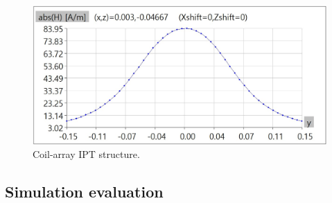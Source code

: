 \begin{figure}[htbp]
    \centering
    \includegraphics[width=0.9\linewidth]{images/4_two_ring_near_field_distribution_cut.JPG}
    \caption{Coil-array IPT structure.}
\end{figure}


\subsection{Simulation evaluation}



